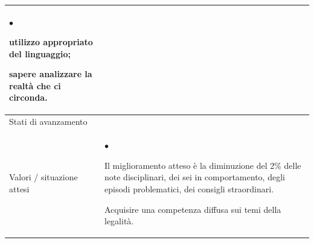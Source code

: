\documentclass[12pt,a4paper,oneside]{memoir}
\newenvironment{elenco}{\begin{list}{$\bullet$}{%
              \setlength{\leftmargin}{4mm}%
              \setlength{\rightmargin}{1mm}%
               \setlength{\itemindent}{0mm}%
               \setlength{\labelwidth}{2mm}%
               \setlength{\labelsep}{2mm}%
              \setlength{\itemsep}{-\parsep}%
              \setlength{\partopsep}{0pt}%
              \setlength{\topsep}{0pt}%
             \setlength{\parskip}{0pt}%
              }}{\end{list}}
\begin{document}
\begin{footnotesize}
\begin{longtable}{|>{\raggedright}p{2.5cm}|>{\raggedright\arraybackslash}P{10cm}|}
\begin{elenco}
\item utilizzo appropriato del linguaggio;
\item sapere analizzare la realtà che ci circonda.
\end{elenco}\\[-4mm] \hline
Stati di avanzamento&\\ \hline
Valori / situazione attesi&
\begin{elenco}
\item Il miglioramento atteso è la diminuzione del 2\% delle note disciplinari, dei sei in comportamento, degli episodi problematici, dei consigli straordinari. 
\item Acquisire una competenza diffusa sui temi della legalità.
\end{elenco}\\ \hline
\end{longtable}
\end{footnotesize}

\clearpage
\end{document}
